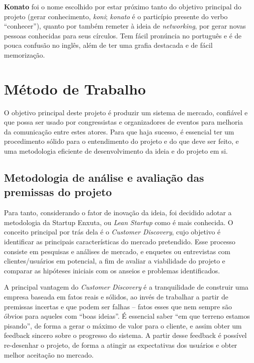 \documentclass[12pt,a4paper,twoside,hyphens,english,brazil]{abntex2}
\begin{document}
\textbf{Konato} foi o nome escolhido por estar próximo tanto do objetivo principal do projeto (gerar conhecimento, \emph{koni}; \emph{konato} é o particípio presente do verbo ``conhecer''), quanto por também remeter à ideia de \emph{networking}, por gerar novas pessoas conhecidas para seus círculos. Tem fácil pronúncia no português e é de pouca confusão no inglês, além de ter uma grafia destacada e de fácil memorização.


\section{Método de Trabalho} \label{sec:metodo}
O objetivo principal deste projeto é produzir um sistema de mercado, confiável e que possa ser usado por congressistas e organizadores de eventos para melhoria da comunicação entre estes atores. Para que haja sucesso, é essencial ter um procedimento sólido para o entendimento do projeto e do que deve ser feito, e uma metodologia eficiente de desenvolvimento da ideia e do projeto em si.

\subsection{Metodologia de análise e avaliação das premissas do projeto}
Para tanto, considerando o fator de inovação da ideia, foi decidido adotar a metodologia da Startup Enxuta, ou \emph{Lean Startup} como é mais conhecida. O conceito principal por trás dela é o \emph{Customer Discovery}\cite{manual-startup}, cujo objetivo é identificar as principais características do mercado pretendido. Esse processo consiste em pesquisas e análises de mercado, e enquetes ou entrevistas com clientes/usuários em potencial, a fim de avaliar a viabilidade do projeto e comparar as hipóteses iniciais com os anseios e problemas identificados.

A principal vantagem do \emph{Customer Discovery} é a tranquilidade de construir uma empresa baseada em fatos reais e sólidos, ao invés de trabalhar a partir de premissas incertas e que podem ser falhas -- fatos esses que nem sempre são óbvios para aqueles com ``boas ideias''. É essencial saber ``em que terreno estamos pisando'', de forma a gerar o máximo de valor para o cliente, e assim obter um feedback sincero sobre o progresso do sistema. A partir desse feedback é possível re-desenhar o projeto, de forma a atingir as expectativas dos usuários e obter melhor aceitação no mercado.
\end{document}
